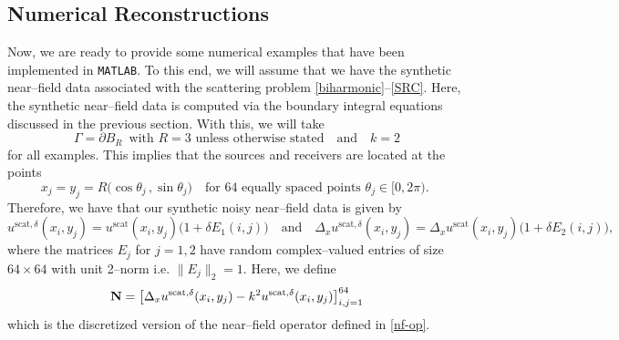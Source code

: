 \documentclass{article}
\numberwithin{equation}{section}
\begin{document}
{\subsection{Numerical Reconstructions}
Now, we are ready to provide some numerical examples that have been implemented in \texttt{MATLAB}. To this end, we will assume that we have the synthetic near--field data associated with the scattering problem \eqref{biharmonic}--\eqref{SRC}. Here, the synthetic near--field data is computed via the boundary integral equations discussed in the previous section. With this, we will take 
$$\Gamma = \partial B_R \,\,\, \text{with $R=3$ unless otherwise stated} \quad  \text{and} \quad k=2$$
for all examples. This implies that the sources and receivers are located at the points 
$$x_j=y_j = R \big( \cos \theta_j \, , \sin \theta_j) \quad \text{for 64 equally spaced points  $\theta_j  \in [0 , 2\pi )$. }$$ 
Therefore, we have that our synthetic noisy near--field data is given by 
$$u^{\text{scat},\delta} (x_i , y_j)= u^{\text{scat}}(x_i , y_j) \big(1 + \delta E_1({i,j}) \big) \quad \text{and} \quad  \Delta_x u^{\text{scat},\delta} (x_i , y_j) =  \Delta_x u^{\text{scat}} (x_i , y_j) \big(1 + \delta E_2({i,j}) \big),$$
where the matrices $E_j$ for $j=1,2$ have random complex--valued entries of size $64 \times 64$ with unit 2--norm i.e. $\|E_j\|_{2} = 1$. Here, we define 
$${\bf N} = \big[ \Delta_x u^{\text{scat},\delta} (x_i , y_j) - k^2 u^{\text{scat},\delta} (x_i , y_j) \big]_{i,j = 1}^{64}$$
which is the discretized version of the near--field operator defined in \eqref{nf-op}. 


}
\end{document}
